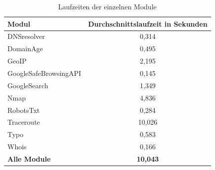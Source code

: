 \begin{table}[!hbt]
	\begin{center}
		\begin{tabular}{ l c }
			\toprule
			\textbf{Modul} & \textbf{Durchschnittslaufzeit in Sekunden}\\
			\midrule   
			DNSresolver            & 0,314 \\
			DomainAge               & 0,495 \\
			GeoIP                   & 2,195 \\
			GoogleSafeBrowsingAPI   & 0,145 \\
			GoogleSearch            & 1,349 \\
			Nmap                    & 4,836 \\
			RobotsTxt               & 0,284 \\
			Traceroute              & 10,026 \\
			Typo                    & 0,583 \\
			Whois                   & 0,166 \\
			\midrule
			\textbf{Alle Module}    & \textbf{10,043} \\
			\bottomrule
		\end{tabular}
		\caption{Laufzeiten der einzelnen Module}\label{tab.laufzeit}
	\end{center}
\end{table}


